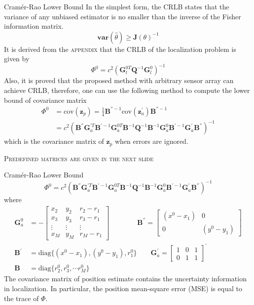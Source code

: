 \documentclass[10pt]{beamer}
\begin{document}
\begin{frame}{Cram\'{e}r-Rao Lower Bound}
  In the simplest form, the CRLB states that the variance of any unbiased estimator
  is no smaller than the inverse of the Fisher information matrix.
   $$\textbf{var}(\hat{\theta}) \geqslant \textbf{J}(\theta)^{-1} $$
  It is derived from the \textsc{appendix} that the CRLB of the localization problem
  is given by
   $$ \Phi^0 = c^2 (\textbf{G}_t^{0T} \textbf{Q}^{-1} \textbf{G}_l^0)^{-1} $$
  Also, it is proved that the proposed method with arbitrary sensor array can achieve CRLB,
  therefore, one can use the following method to compute the lower bound of covariance matrix
  \begin{align*}
    \Phi^0 &= \text{cov}(\textbf{z}_p) = \frac{1}{4} \textbf{B}^{''-1} \text{cov} (\textbf{z}_a^{'}) \textbf{B}^{''-1} \\
           &= c^2 ( \textbf{B}^{''} \textbf{G}_a^{'T} \textbf{B}^{'-1} \textbf{G}_a^{0T} \textbf{B}^{-1} \textbf{Q}^{-1} \textbf{B}^{-1} \textbf{G}_a^{0}  \textbf{B}^{'-1} \textbf{G}_a^{'} \textbf{B}^{''} )^{-1}
  \end{align*}
  which is the covariance matrix of $\textbf{z}_p$ when errors are ignored.
  \begin{center}
    \textsc{Predefined matrices are given in the next slide}
  \end{center}
\end{frame}
\begin{frame}{Cram\'{e}r-Rao Lower Bound}
  \begin{equation*}
    \Phi^0 = c^2 ( \textbf{B}^{''} \textbf{G}_a^{'T} \textbf{B}^{'-1} \textbf{G}_a^{0T} \textbf{B}^{-1} \textbf{Q}^{-1} \textbf{B}^{-1} \textbf{G}_a^{0}  \textbf{B}^{'-1} \textbf{G}_a^{'} \textbf{B}^{''} )^{-1}
  \end{equation*}
  where
  \begin{align*}
     \textbf{G}_a^0   &= - \begin{bmatrix} x_2  & y_2 & r_2-r_1 \\   x_3  & y_3 & r_3-r_1 \\ \vdots & \vdots & \vdots \\  x_M  & y_M & r_M-r_1 \end{bmatrix} \qquad \qquad
     \textbf{B}^{''}  = \begin{bmatrix} (x^0 - x_1) & 0 \\  0 & (y^0 - y_1)\end{bmatrix}\\
     \textbf{B}^{'}\  &= \text{diag}\{(x^0 - x_1),(y^0 - y_1),r_1^0\}\qquad
     \textbf{G}_a^{'} = \begin{bmatrix} 1 & 0 & 1 \\  0 & 1 & 1\end{bmatrix}^{'} \\
     \textbf{B}  \ \  &= \text{diag}\{r_2^0, r_3^0, \cdots r_M^0\}
   \end{align*}
   The covariance matrix of position estimate contains the uncertainty information in localization.
   In particular, the position mean-square error (\textsc{MSE}) is equal to the \alert{trace} of $\Phi$.
\end{frame}
\end{document}
